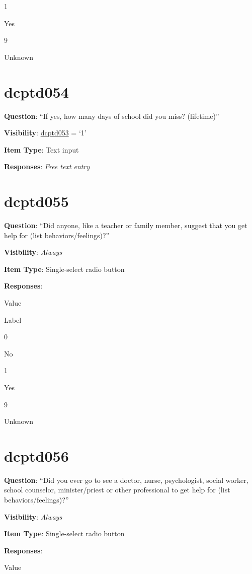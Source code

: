 \documentclass[]{book}
\begin{document}
1

Yes

9

Unknown

\hypertarget{dcptd054}{%
\section{dcptd054}\label{dcptd054}}

\textbf{Question}: ``If yes, how many days of school did you miss? (lifetime)''

\textbf{Visibility}: \protect\hyperlink{dcptd053}{dcptd053} = `1'

\textbf{Item Type}: Text input

\textbf{Responses}: \emph{Free text entry}

\hypertarget{dcptd055}{%
\section{dcptd055}\label{dcptd055}}

\textbf{Question}: ``Did anyone, like a teacher or family member, suggest that you get help for (list behaviors/feelings)?''

\textbf{Visibility}: \emph{Always}

\textbf{Item Type}: Single-select radio button

\textbf{Responses}:

Value

Label

0

No

1

Yes

9

Unknown

\hypertarget{dcptd056}{%
\section{dcptd056}\label{dcptd056}}

\textbf{Question}: ``Did you ever go to see a doctor, nurse, psychologist, social worker, school counselor, minister/priest or other professional to get help for (list behaviors/feelings)?''

\textbf{Visibility}: \emph{Always}

\textbf{Item Type}: Single-select radio button

\textbf{Responses}:

Value
\end{document}
